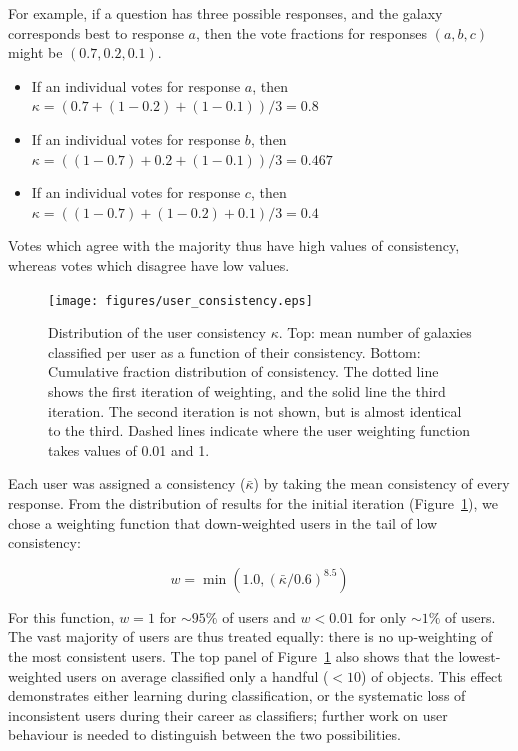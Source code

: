 \documentclass[useAMS,usenatbib]{mn2e}
\begin{document}
For example, if a question has three possible responses, and the galaxy corresponds best to response $a$, then the vote fractions for responses $(a, b, c)$ might be $(0.7, 0.2, 0.1)$.
\begin{itemize}
\item If an individual votes for response $a$, then \\$\kappa = (0.7 + (1-0.2) + (1-0.1))/3 = 0.8$
\item If an individual votes for response $b$, then \\$\kappa = ((1-0.7) + 0.2 + (1-0.1))/3 = 0.467$
\item If an individual votes for response $c$, then \\$\kappa = ((1-0.7) + (1-0.2) + 0.1)/3 = 0.4$
\end{itemize}
\noindent Votes which agree with the majority thus have high values of consistency, whereas votes which disagree have low values.

\begin{figure}
\texttt{[image: figures/user\_consistency.eps]}
\caption{Distribution of the user consistency $\kappa$. Top: mean number of galaxies classified per user as a function of their consistency. Bottom: Cumulative fraction distribution of consistency. The dotted line shows the first iteration of weighting, and the solid line the third iteration. The second iteration is not shown, but is almost identical to the third. Dashed lines indicate where the user weighting function takes values of 0.01 and 1. 
\label{fig-consistency}}
\end{figure}

Each user was assigned a consistency ($\bar{\kappa}$) by taking the mean consistency of every response. From the distribution of results for the initial iteration (Figure~\ref{fig-consistency}), we chose a weighting function that down-weighted users in the tail of low consistency:

\begin{equation}
w = \min \left(1.0,(\bar{\kappa} / 0.6)^{8.5} \right)
\label{eqn-weight}
\end{equation}

\noindent For this function, $w=1$ for $\sim95\%$ of users and $w<0.01$ for only $\sim1\%$ of users. The vast majority of users are thus treated equally: there is no up-weighting of the most consistent users. The top panel of Figure~\ref{fig-consistency} also shows that the lowest-weighted users on average classified only a handful ($<10$) of objects. This effect demonstrates either learning during classification, or the systematic loss of inconsistent users during their career as classifiers; further work on user behaviour is needed to distinguish between the two possibilities.
\end{document}

